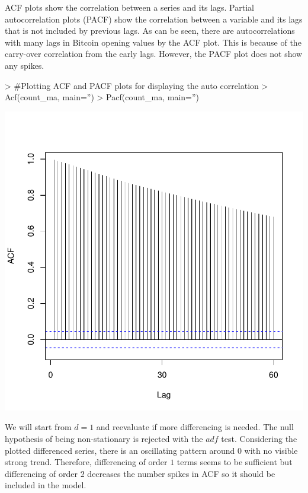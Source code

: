 \documentclass{article}
\begin{document}
ACF plots show the correlation between a series and its lags. Partial autocorrelation plots (PACF) show the correlation between a variable and its lags that is not included by previous lags. 
As can be seen, there are autocorrelations with many lags in Bitcoin opening values by the ACF plot. This is because of the carry-over correlation from the early lags. However, the PACF plot does not show any spikes.

\begin{Schunk}
\begin{Sinput}
> #Plotting ACF and PACF plots for displaying the auto correlation
> Acf(count_ma, main='')
> Pacf(count_ma, main='')
\end{Sinput}
\end{Schunk}
\includegraphics{Report-013}

We will start from $d=1$ and reevaluate if more differencing is needed. The null hypothesis of being non-stationary is rejected with the $adf$ test. Considering the plotted differenced series, there is an oscillating pattern around $0$ with no visible strong trend. Therefore, differencing of order $1$ terms seems to be sufficient but differencing of order $2$ decreases the number spikes in ACF so it should be included in the model. 
\end{document}
